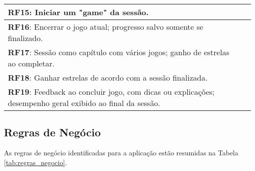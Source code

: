 \begin{itemize}
\begin{longtable}{|p{6cm}|p{6cm}|}
    \hline
    \textbf{RF15}: Iniciar um "game" da sessão. & \\
    \hline
    \textbf{RF16}: Encerrar o jogo atual; progresso salvo somente se finalizado. & \\
    \hline
    \textbf{RF17}: Sessão como capítulo com vários jogos; ganho de estrelas ao completar. & \\
    \hline
    \textbf{RF18}: Ganhar estrelas de acordo com a sessão finalizada. & \\
    \hline
    \textbf{RF19}: Feedback ao concluir jogo, com dicas ou explicações; desempenho geral exibido ao final da sessão. & \\
    \hline
\end{longtable}
\subsection{Regras de Negócio}

As regras de negócio identificadas para a aplicação estão resumidas na Tabela \ref{tab:regras_negocio}.


\end{itemize}
